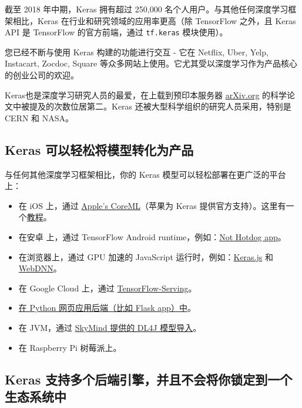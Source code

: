 截至 2018 年中期，Keras 拥有超过 250,000 名个人用户。与其他任何深度学习框架相比，Keras 在行业和研究领域的应用率更高（除 TensorFlow 之外，且 Keras API 是 TensorFlow 的官方前端，通过 \texttt{tf.keras} 模块使用）。

您已经不断与使用 Keras 构建的功能进行交互 - 它在 Netflix, Uber, Yelp,
Instacart, Zocdoc, Square
等众多网站上使用。它尤其受以深度学习作为产品核心的创业公司的欢迎。

Keras也是深度学习研究人员的最爱，在上载到预印本服务器
\href{https://arxiv.org/archive/cs}{arXiv.org}
的科学论文中被提及的次数位居第二。Keras
还被大型科学组织的研究人员采用，特别是 CERN 和 NASA。




\subsection{Keras 可以轻松将模型转化为产品}

与任何其他深度学习框架相比，你的 Keras 模型可以轻松部署在更广泛的平台上：

\begin{itemize}
\tightlist
\item
  在 iOS 上，通过
  \href{https://developer.apple.com/documentation/coreml}{Apple's
  CoreML}（苹果为 Keras 提供官方支持）。这里有一个\href{https://www.pyimagesearch.com/2018/04/23/running-keras-models-on-ios-with-coreml/}{教程}。
\item
  在安卓 上，通过 TensorFlow Android
  runtime，例如：\href{https://medium.com/@timanglade/how-hbos-silicon-valley-built-not-hotdog-with-mobile-tensorflow-keras-react-native-ef03260747f3}{Not
  Hotdog app}。
\item
  在浏览器上，通过 GPU 加速的 JavaScript
  运行时，例如：\href{https://transcranial.github.io/keras-js/\#/}{Keras.js}
  和 \href{https://mil-tokyo.github.io/webdnn/}{WebDNN}。
\item
  在 Google Cloud 上，通过
  \href{https://www.tensorflow.org/serving/}{TensorFlow-Serving}。
\item
  \href{https://blog.keras.io/building-a-simple-keras-deep-learning-rest-api.html}{在 Python 网页应用后端（比如 Flask app）中}。
\item
  在 JVM，通过
  \href{https://deeplearning4j.org/model-import-keras}{SkyMind 提供的
  DL4J 模型导入}。
\item
  在 Raspberry Pi 树莓派上。
\end{itemize}


\subsection{Keras
支持多个后端引擎，并且不会将你锁定到一个生态系统中}\label{keras-ux652fux6301ux591aux4e2aux540eux7aefux5f15ux64ceux5e76ux4e14ux4e0dux4f1aux5c06ux4f60ux9501ux5b9aux5230ux4e00ux4e2aux751fux6001ux7cfbux7edfux4e2d}


